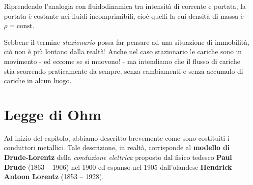 \begin{intuit}
	Riprendendo l'analogia con fluidodinamica tra intensità di corrente e portata, la portata è costante nei fluidi incomprimibili, cioè quelli la cui densità di massa è $\rho=\mathrm{const}$.
\end{intuit}
\begin{attention}
	Sebbene il termine \textit{stazionario} possa far pensare ad una situazione di immobilità, ciò non è più lontano dalla realtà! Anche nel caso stazionario le cariche sono in movimento - ed eccome se si muovono! - ma intendiamo che il flusso di cariche stia scorrendo praticamente da sempre, senza cambiamenti e senza accumulo di cariche in alcun luogo.
\end{attention}
\section{Legge di Ohm}
Ad inizio del capitolo, abbiamo descritto brevemente come sono costituiti i conduttori metallici. Tale descrizione, in realtà, corrisponde al \textbf{modello di Drude-Lorentz} della \textit{conduzione elettrica} proposto dal fisico tedesco \textbf{Paul Drude} (1863 – 1906) nel 1900 ed espanso nel 1905 dall'olandese \textbf{Hendrick Antoon Lorentz} (1853 – 1928).

